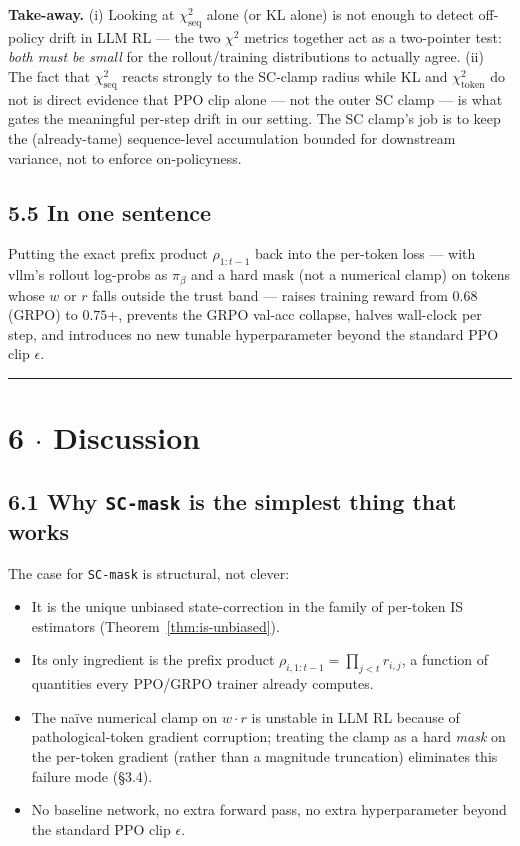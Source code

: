 \documentclass[11pt,a4paper]{article}
\theoremstyle{remark}
\begin{document}
\textbf{Take-away.} (i) Looking at $\chi^2_{\mathrm{seq}}$ alone (or KL alone) is not enough to detect off-policy drift in LLM RL --- the two $\chi^2$ metrics together act as a two-pointer test: \emph{both must be small} for the rollout/training distributions to actually agree. (ii) The fact that $\chi^2_{\mathrm{seq}}$ reacts strongly to the SC-clamp radius while KL and $\chi^2_{\mathrm{token}}$ do not is direct evidence that PPO clip alone --- not the outer SC clamp --- is what gates the meaningful per-step drift in our setting. The SC clamp's job is to keep the (already-tame) sequence-level accumulation bounded for downstream variance, not to enforce on-policyness.

\subsection*{5.5 In one sentence}

Putting the exact prefix product $\rho_{1:t-1}$ back into the per-token loss --- with vllm's rollout log-probs as $\pi_\beta$ and a hard mask (not a numerical clamp) on tokens whose $w$ or $r$ falls outside the trust band --- raises training reward from $0.68$ (GRPO) to $0.75$+, prevents the GRPO val-acc collapse, halves wall-clock per step, and introduces no new tunable hyperparameter beyond the standard PPO clip $\epsilon$.

\vspace{0.5em}\hrule\vspace{0.5em}
\section*{6 $\cdot$ Discussion}

\subsection*{6.1 Why \texttt{SC-mask} is the simplest thing that works}

The case for \texttt{SC-mask} is structural, not clever:

\begin{itemize}[leftmargin=1.2em]
\item It is the unique unbiased state-correction in the family of per-token IS estimators (Theorem~\ref{thm:is-unbiased}).
\item Its only ingredient is the prefix product $\rho_{i,1:t-1}=\prod_{j<t} r_{i,j}$, a function of quantities every PPO/GRPO trainer already computes.
\item The naïve numerical clamp on $w\!\cdot\! r$ is unstable in LLM RL because of pathological-token gradient corruption; treating the clamp as a hard \emph{mask} on the per-token gradient (rather than a magnitude truncation) eliminates this failure mode (§3.4).
\item No baseline network, no extra forward pass, no extra hyperparameter beyond the standard PPO clip $\epsilon$.
\end{itemize}
\end{document}
